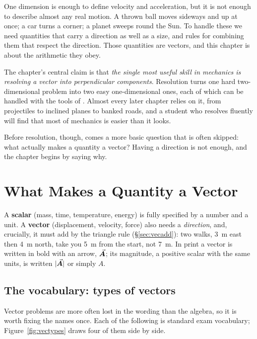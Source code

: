 
One dimension is enough to define velocity and acceleration, but it is not enough to describe almost
any real motion. A thrown ball moves sideways and up at once; a car turns a corner; a planet sweeps
round the Sun. To handle these we need quantities that carry a direction as well as a size, and rules
for combining them that respect the direction. Those quantities are vectors, and this chapter is about
the arithmetic they obey.

The chapter's central claim is that \emph{the single most useful skill in mechanics is resolving a
vector into perpendicular components}. Resolution turns one
hard two-dimensional problem into two easy one-dimensional ones, each of which can be handled with the
tools of . Almost every later chapter relies on it, from projectiles to inclined planes to
banked roads, and a student who resolves fluently will find that most of mechanics is easier than it
looks.

Before resolution, though, comes a more basic question that is often skipped: what actually makes a
quantity a vector? Having a direction is not enough, and the chapter begins by saying why.

\section{What Makes a Quantity a Vector}

A \textbf{scalar} (mass, time, temperature, energy) is fully specified by a number and a unit. A
\textbf{vector} (displacement, velocity, force) also needs a \emph{direction}, and, crucially, it
must add by the triangle rule (\S\ref{sec:vecadd}): two walks, \SI{3}{m} east then \SI{4}{m} north, take
you \SI{5}{m} from the start, not \SI{7}{m}. In print a vector is written in
bold with an arrow, $\vec{\bm{A}}$; its magnitude, a positive scalar with the same units, is written $|\vec{\bm{A}}|$
or simply $A$.

\subsection{The vocabulary: types of vectors}

Vector problems are more often lost in the wording than the algebra, so it is worth fixing the names
once. Each of the following is standard exam vocabulary; Figure~\ref{fig:vectypes} draws four of them
side by side.

